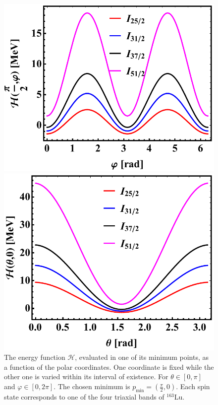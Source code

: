 \documentclass[11pt]{article}
\begin{document}
\begin{figure}
\centering
\begin{minipage}{.5\textwidth}
  \centering
  \includegraphics[scale=0.58]{figs/energyFunction_minTheta.pdf}
\end{minipage}%
\begin{minipage}{.5\textwidth}
  \centering
 \includegraphics[scale=0.55]{figs/energyFunction_minVarphi.pdf}
\end{minipage}
\caption{The energy function $\mathcal{H}$, evaluated in one of its minimum points, as a function of the polar coordinates. One coordinate is fixed while the other one is varied within its interval of existence. For $\theta\in[0,\pi]$ and $\varphi\in[0,2\pi]$. The chosen minimum is $p_\text{min}=\left(\frac{\pi}{2},0\right)$. Each spin state corresponds to one of the four triaxial bands of $^{163}$Lu.}
    \label{energy-function-min-point-evolution}
\end{figure}
\end{document}
